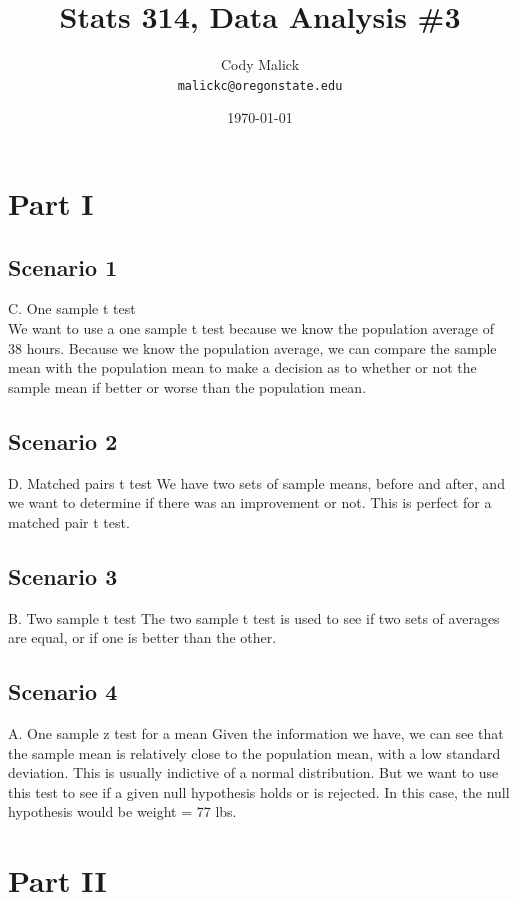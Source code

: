 \documentclass[10pt,letterpaper]{article}
\begin{document}
  \title{Stats 314, Data Analysis \#3}
  \author{Cody Malick\\
  \texttt{malickc@oregonstate.edu}}
  \date{\today}
  \maketitle

\section*{Part I}
\subsection*{Scenario 1}
C. One sample t test\\
We want to use a one sample t test because we know the population average of 38
hours. Because we know the population average, we can compare the sample mean
with the population mean to make a decision as to whether or not the sample mean
if better or worse than the population mean.

\subsection*{Scenario 2}
D. Matched pairs t test
We have two sets of sample means, before and after, and we want to determine if
there was an improvement or not. This is perfect for a matched pair t test.

\subsection*{Scenario 3}
B. Two sample t test
The two sample t test is used to see if two sets of averages are equal, or if
one is better than the other. 

\subsection*{Scenario 4}
A. One sample z test for a mean
Given the information we have, we can see that the sample mean is relatively
close to the population mean, with a low standard deviation. This is usually
indictive of a normal distribution. But we want to use this test to see if a
given null hypothesis holds or is rejected. In this case, the null hypothesis
would be weight = 77 lbs. 

\section*{Part II}
\end{document}
